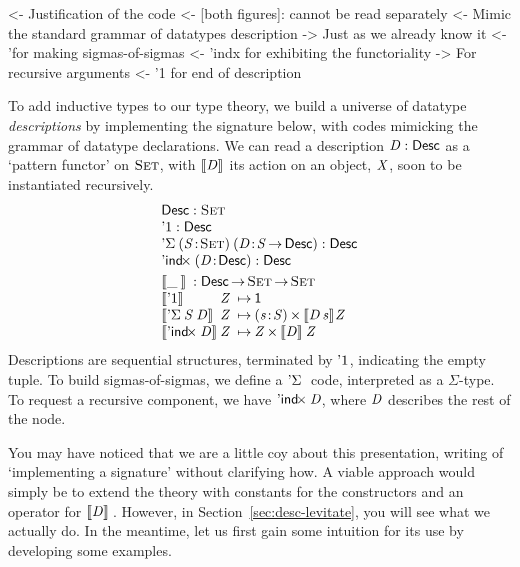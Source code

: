 \begin{wstructure}
<- Justification of the code 
    <- [both figures]: cannot be read separately
    <- Mimic the standard grammar of datatypes description
        -> Just as we already know it
        <- '\Sigma for making sigmas-of-sigmas
        <- 'indx for exhibiting the functoriality
            -> For recursive arguments
        <- '1 for end of description
\end{wstructure}

To add inductive types to our type theory, we build a universe of
datatype \emph{descriptions} by implementing the signature below, with
codes mimicking the grammar of datatype declarations. We
can read a description $\V{D}:\Desc$ as a `pattern functor'
on $\Set$, with $\descop{\V{D}}{\!}$ its action on an object, \(\V{X}\), soon
to be instantiated recursively.
%
\[\stk{
\begin{array}{l}
\Desc : \Set\\
\DUnit : \Desc\\
\DSigma{(\Bhab{\V{S}}{\Set})}{(\Bhab{\V{D}}{\V{S} \To \Desc})} : \Desc\\
\DIndx{(\Bhab{\V{D}}{\Desc})} : \Desc \\
\end{array}
\smallskip\\
\begin{array}{l@{\V{Z}\:\mapsto\:}l}     
\multicolumn{2}{l}{\descop{\_\:}{} : \Desc \To \Set \To \Set} \\
 \descop{\DUnit}{} &  \Unit \\
 \descop{\DSigma{\V{S}}{\V{D}}}{} &
     \SIGMAS{\Bhab{\V{s}}{\V{S}}}{\descop{\V{D}\,\V{s}}{\!\V{Z}}}  \\
\descop{\DIndx{\V{D}}}{}  &  \TIMES{\V{Z}}{\descop{\V{D}}{\V{Z}}}
\end{array}
}\]
%
Descriptions are sequential structures, terminated by $\DUnit$, indicating
the empty tuple. To build
sigmas-of-sigmas, we define a $\DSigma{\!}{}$ code, interpreted as a
$\Sigma$-type. To request a recursive component, we have $\DIndx{\V{D}}$,
where \(\V{D}\) describes the rest of the node.

You may have noticed that we are a little coy about this presentation,
writing of `implementing a signature' without clarifying how. A viable
approach would simply be to extend the theory with constants for the
constructors and an operator for \(\descop{\V{D}}\). However, in
Section~\ref{sec:desc-levitate}, you will see what we actually do.  In
the meantime, let us first gain some intuition for its use by
developing some examples.

